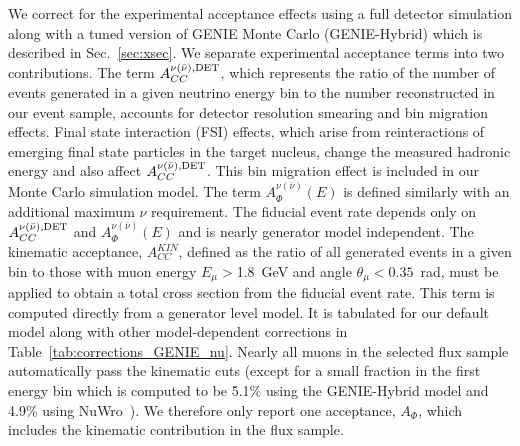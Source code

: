 \documentclass[aps,preprint,showpacs,superscriptaddress,linenumbers,nofootinbib,prd,12pt]{revtex4}
\newcommand{\afluxs}{\ensuremath{A_{\Phi}^{\nu(\bar{\nu})}(E)}}
\begin{document}
We correct for the experimental acceptance effects using a full  
detector simulation along with a tuned version of 
GENIE Monte Carlo (GENIE-Hybrid) which is described in Sec.~\ref{sec:xsec}. 
We separate experimental acceptance terms into two contributions. 
The term $A_{CC}^{\nu(\bar{\nu}),\rm DET}$,  which represents the ratio of the number of events generated in a given neutrino energy bin to the number 
reconstructed in our event sample, accounts for detector resolution smearing and bin migration effects. 
Final state interaction (FSI) effects, which arise from reinteractions of emerging 
final state particles in the target nucleus, change the measured hadronic energy
and also affect $A_{CC}^{\nu(\bar{\nu}),\rm DET}$. This bin migration effect is included in our Monte Carlo simulation
model. The term \afluxs{} is defined similarly with an additional maximum $\nu$ requirement.
%
The fiducial event rate 
depends only on $A_{CC}^{\nu(\bar{\nu}),\rm DET}$ and \afluxs{}
and 
is nearly generator model independent.
The kinematic acceptance, $A^{KIN}_{CC}$,
defined as the ratio of all generated events 
in a given bin to those with muon energy $E_\mu>$1.8~GeV and angle $\theta_\mu<0.35$~rad,
must be applied to obtain a total cross section from the fiducial event rate.
This term is computed directly from a generator level model. It is tabulated for our default model
along with other model-dependent corrections
in Table~\ref{tab:corrections_GENIE_nu}.
Nearly all muons in the selected flux sample automatically pass the kinematic cuts (except for 
a small fraction in the first energy bin which is computed to be 5.1\% using the GENIE-Hybrid model and 4.9\% using NuWro~\cite{Golan:2012wx}).
We therefore only report one acceptance, $A_{\Phi}$, which includes the kinematic
contribution in the flux sample.
\end{document}
